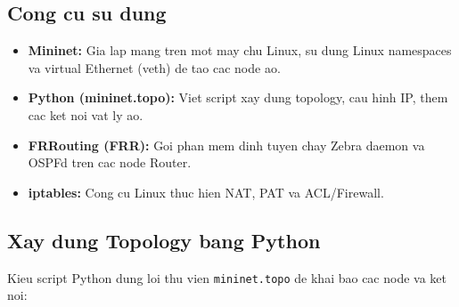 \subsection{Cong cu su dung}

\begin{itemize}
    \item \textbf{Mininet:} Gia lap mang tren mot may chu Linux, su dung Linux namespaces va virtual Ethernet (veth) de tao cac node ao.
    \item \textbf{Python (mininet.topo):} Viet script xay dung topology, cau hinh IP, them cac ket noi vat ly ao.
    \item \textbf{FRRouting (FRR):} Goi phan mem dinh tuyen chay Zebra daemon va OSPFd tren cac node Router.
    \item \textbf{iptables:} Cong cu Linux thuc hien NAT, PAT va ACL/Firewall.
\end{itemize}

\subsection{Xay dung Topology bang Python}

Kieu script Python dung loi thu vien \texttt{mininet.topo} de khai bao cac node va ket noi:

